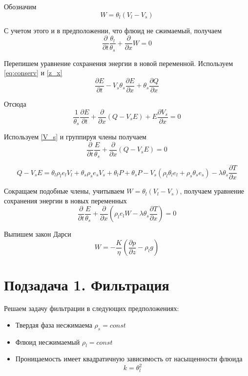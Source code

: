 \documentclass[12pt]{article}
\newcommand{\pd}[2]{\frac{\partial #1}{\partial #2}}
\begin{document}
Обозначим 
\begin{equation}
W = \theta_l (V_l - V_s )
\label{W_filtr}
\end{equation}

С учетом этого и в предположении, что флюид не сжимаемый, получаем
\begin{equation}
\pd{}{t}\frac{\theta_l}{\theta_s} + \pd{}{x}W = 0
\label{filtr_compr}
\end{equation}

Перепишем уравнение сохранения энергии в новой переменной. Используем \eqref{eq:conserv} и \eqref{z_x}
$$
\pd{E}{t} - V_s\theta_s\pd{E}{x} + \theta_s\pd{Q}{x}
$$

Отсюда
$$
\frac{1}{\theta_s}\pd{E}{t} + \pd{}{x}(Q-V_s E) + E\pd{V_s}{x} = 0
$$

Используем \eqref{V_s} и группируя члены получаем
\begin{equation}
\pd{}{t}\frac{E}{\theta_s} + \pd{}{x}(Q - V_s E) = 0
\end{equation}

$$
Q-V_s E = \theta_l\rho_l e_l V_l + \theta_s\rho_s e_s V_s + \theta_l P + \theta_s P -V_s(\rho_l\theta_l e_l +\rho_s\theta_s e_s) - \lambda\theta_s\pd{T}{x}
$$

Сокращаем подобные члены, учитываем $W = \theta_l (V_l - V_s )$, получаем уравнение сохранения энергии в новых переменных
\begin{equation}
\pd{}{t}\frac{E}{\theta_s} + \pd{}{x}(\rho_l e_l W - \lambda\theta_s\pd{T}{x}) = 0
\label{eq:conserv_new}
\end{equation}

Выпишем закон Дарси
\begin{equation}
W= -\frac{K}{\eta}\left(\pd{p}{z} - \rho_l g \right)
\label{Darsi}
\end{equation}
\newpage
\section*{Подзадача 1. Фильтрация}

Решаем задачу фильтрации в следующих предположениях:
\begin{itemize}
\item Твердая фаза несжимаема $\rho_s = const $
\item Флюид несжимаемый $\rho_l = const $
\item Проницаемость имеет квадратичную зависимость от насыщенности флюида
\begin{equation}
k=\theta_l^2
\label{perm}
\end{equation}
\end{itemize}
\end{document}
